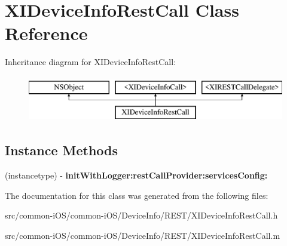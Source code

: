\hypertarget{interface_x_i_device_info_rest_call}{}\section{X\+I\+Device\+Info\+Rest\+Call Class Reference}
\label{interface_x_i_device_info_rest_call}
Inheritance diagram for X\+I\+Device\+Info\+Rest\+Call\+:\begin{figure}[H]
\begin{center}
\leavevmode
\includegraphics[height=2.000000cm]{interface_x_i_device_info_rest_call}
\end{center}
\end{figure}
\subsection*{Instance Methods}
\begin{DoxyCompactItemize}
\item 
\hypertarget{interface_x_i_device_info_rest_call_a69459c4d1d9725a032abda07f75ad936}{}\label{interface_x_i_device_info_rest_call_a69459c4d1d9725a032abda07f75ad936} 
(instancetype) -\/ {\bfseries init\+With\+Logger\+:rest\+Call\+Provider\+:services\+Config\+:}
\end{DoxyCompactItemize}


The documentation for this class was generated from the following files\+:\begin{DoxyCompactItemize}
\item 
src/common-\/i\+O\+S/common-\/i\+O\+S/\+Device\+Info/\+R\+E\+S\+T/X\+I\+Device\+Info\+Rest\+Call.\+h\item 
src/common-\/i\+O\+S/common-\/i\+O\+S/\+Device\+Info/\+R\+E\+S\+T/X\+I\+Device\+Info\+Rest\+Call.\+m\end{DoxyCompactItemize}
